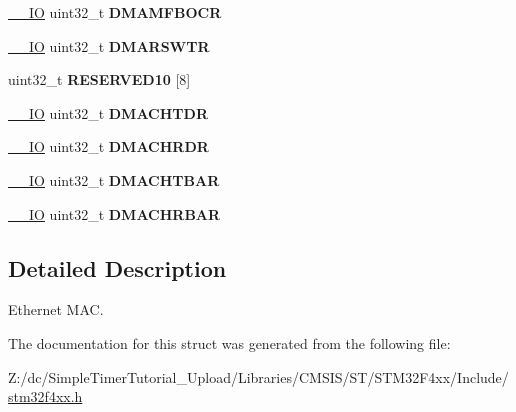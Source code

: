 \begin{DoxyCompactItemize}
\item 
\hypertarget{struct_e_t_h___type_def_a12eba1fc5d54aa50fdda201f7f9a84a3}{\hyperlink{group___c_m_s_i_s__core__definitions_gaec43007d9998a0a0e01faede4133d6be}{\-\_\-\-\_\-\-I\-O} uint32\-\_\-t {\bfseries D\-M\-A\-M\-F\-B\-O\-C\-R}}\label{struct_e_t_h___type_def_a12eba1fc5d54aa50fdda201f7f9a84a3}

\item 
\hypertarget{struct_e_t_h___type_def_ac6fe9e194ed9d08bf6bd28ceb80ac4b0}{\hyperlink{group___c_m_s_i_s__core__definitions_gaec43007d9998a0a0e01faede4133d6be}{\-\_\-\-\_\-\-I\-O} uint32\-\_\-t {\bfseries D\-M\-A\-R\-S\-W\-T\-R}}\label{struct_e_t_h___type_def_ac6fe9e194ed9d08bf6bd28ceb80ac4b0}

\item 
\hypertarget{struct_e_t_h___type_def_a57d552323802fb4dd0bac95a02e814f0}{uint32\-\_\-t {\bfseries R\-E\-S\-E\-R\-V\-E\-D10} \mbox{[}8\mbox{]}}\label{struct_e_t_h___type_def_a57d552323802fb4dd0bac95a02e814f0}

\item 
\hypertarget{struct_e_t_h___type_def_ab5bb348210fdd9a5538eb57abc5a5673}{\hyperlink{group___c_m_s_i_s__core__definitions_gaec43007d9998a0a0e01faede4133d6be}{\-\_\-\-\_\-\-I\-O} uint32\-\_\-t {\bfseries D\-M\-A\-C\-H\-T\-D\-R}}\label{struct_e_t_h___type_def_ab5bb348210fdd9a5538eb57abc5a5673}

\item 
\hypertarget{struct_e_t_h___type_def_a9c49de2e699886d6604fd2b3d376a0e9}{\hyperlink{group___c_m_s_i_s__core__definitions_gaec43007d9998a0a0e01faede4133d6be}{\-\_\-\-\_\-\-I\-O} uint32\-\_\-t {\bfseries D\-M\-A\-C\-H\-R\-D\-R}}\label{struct_e_t_h___type_def_a9c49de2e699886d6604fd2b3d376a0e9}

\item 
\hypertarget{struct_e_t_h___type_def_a900f9f888342fbdd8ee07e3ee1d4b73c}{\hyperlink{group___c_m_s_i_s__core__definitions_gaec43007d9998a0a0e01faede4133d6be}{\-\_\-\-\_\-\-I\-O} uint32\-\_\-t {\bfseries D\-M\-A\-C\-H\-T\-B\-A\-R}}\label{struct_e_t_h___type_def_a900f9f888342fbdd8ee07e3ee1d4b73c}

\item 
\hypertarget{struct_e_t_h___type_def_acf3f7ecbf774d8d505655ac7f24761fc}{\hyperlink{group___c_m_s_i_s__core__definitions_gaec43007d9998a0a0e01faede4133d6be}{\-\_\-\-\_\-\-I\-O} uint32\-\_\-t {\bfseries D\-M\-A\-C\-H\-R\-B\-A\-R}}\label{struct_e_t_h___type_def_acf3f7ecbf774d8d505655ac7f24761fc}

\end{DoxyCompactItemize}


\subsection{Detailed Description}
Ethernet M\-A\-C. 

The documentation for this struct was generated from the following file\-:\begin{DoxyCompactItemize}
\item 
Z\-:/dc/\-Simple\-Timer\-Tutorial\-\_\-\-Upload/\-Libraries/\-C\-M\-S\-I\-S/\-S\-T/\-S\-T\-M32\-F4xx/\-Include/\hyperlink{stm32f4xx_8h}{stm32f4xx.\-h}\end{DoxyCompactItemize}
